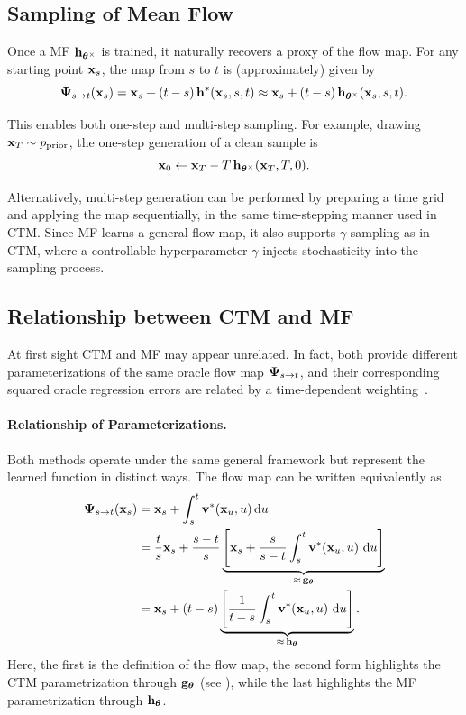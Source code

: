 \subsection{Sampling of Mean Flow}
Once a MF ${\mathbf{h}}_{{\bm{\theta}}^\times}$ is trained, it naturally recovers a proxy of the flow
map. For any starting point ${\mathbf{x}}_s$, the map from $s$ to $t$ is (approximately) given by
\[
{\bm{\Psi}}_{s\to t}({\mathbf{x}}_s) = {\mathbf{x}}_s + (t-s)\,{\mathbf{h}}^*({\mathbf{x}}_s,s,t)
  \approx   {\mathbf{x}}_s + (t-s)\,{\mathbf{h}}_{{\bm{\theta}}^\times}({\mathbf{x}}_s,s,t).
\]

This enables both one-step and multi-step sampling. For example, drawing
${\mathbf{x}}_T\sim p_{\mathrm{prior}}$, the one-step generation of a clean sample is
\[
{\mathbf{x}}_0  \leftarrow  {\mathbf{x}}_T - T\,{\mathbf{h}}_{{\bm{\theta}}^\times}({\mathbf{x}}_T,T,0).
\]

Alternatively, multi-step generation can be performed by preparing a time grid
and applying the map sequentially, in the same time-stepping manner used in
CTM. Since MF learns a general flow map, it also supports $\gamma$-sampling
as in CTM, where a controllable hyperparameter $\gamma$ injects stochasticity
into the sampling process.



\subsection{Relationship between CTM and MF}\label{subsec:equivalence-ctm-mf}
At first sight CTM and MF may appear unrelated.  
In fact, both provide different parameterizations of the same oracle flow
map ${\bm{\Psi}}_{s\to t}$, and their corresponding squared oracle regression
errors are related by a time-dependent weighting~\citep{hu2025cmt}.

\paragraph{Relationship of Parameterizations.}
Both methods operate under the same general framework but represent the learned function in distinct ways.  
The flow map can be written equivalently as
\begin{align*}
{\bm{\Psi}}_{s\to t}({\mathbf{x}}_s)
& = {\mathbf{x}}_s + \int_s^t {\mathbf{v}}^*({\mathbf{x}}_u, u)\mathop{}\!\mathrm{d} u \\
&= \frac{t}{s}{\mathbf{x}}_s
   + \frac{s-t}{s}\underbrace{\Bigg[{\mathbf{x}}_s + \frac{s}{s-t}\int_s^t {\mathbf{v}}^*({\mathbf{x}}_u,u)\,\mathop{}\!\mathrm{d} u\Bigg]}_{\approx\,{\mathbf{g}}_{\bm{\theta}}} \\
&= {\mathbf{x}}_s + (t-s)\underbrace{\Bigg[\frac{1}{t-s}\int_s^t {\mathbf{v}}^*({\mathbf{x}}_u,u)\,\mathop{}\!\mathrm{d} u\Bigg]}_{\approx\,{\mathbf{h}}_{\bm{\theta}}}.
\end{align*}
Here, the first is the definition of the flow map, the second form highlights the CTM parametrization through ${\mathbf{g}}_{\bm{\theta}}$ (see ), while the last highlights the MF parametrization through ${\mathbf{h}}_{\bm{\theta}}$.  


